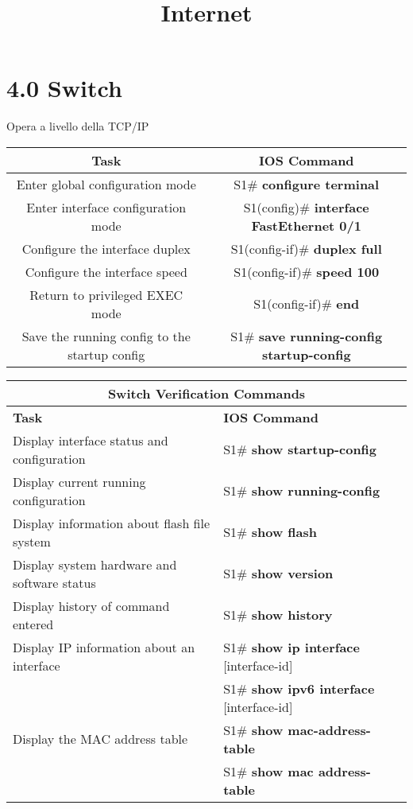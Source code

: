 \documentclass[12pt, a4paper]{article}
\title{Internet}
\date{}
\begin{document}
	\maketitle
	
	\section*{4.0 Switch}
	
	Opera a livello della TCP/IP \\
	\begin{center}
		\begin{tabular}{||c | c||} 
			\hline
			\textbf{Task} & \textbf{IOS Command}  \\ [1ex] 
			\hline\hline
			Enter global configuration mode & S1\# \textbf{configure terminal}  \\  [1ex]
			\hline
			Enter interface configuration mode & S1(config)\# \textbf{interface FastEthernet 0/1} \\ [1ex]
			\hline
			Configure the interface duplex & S1(config-if)\# \textbf{duplex full} \\ [1ex]
			\hline
			Configure the interface speed & S1(config-if)\# \textbf{speed 100} \\ [1ex]
			\hline
			Return to privileged EXEC mode & S1(config-if)\# \textbf{end} \\ [1ex]  
			\hline
			Save the running config to the startup config & S1\# \textbf{save running-config startup-config} \\ [1ex]
			\hline
		\end{tabular}
	\end{center}

	\begin{center}
		\begin{tabular}{ ||p{8cm}||p{8cm}|| }
			\hline
			\multicolumn{2}{|c|}{Switch Verification Commands} \\ [0.5ex]
			\hline\hline
			\textbf{Task} & \textbf{IOS Command} \\
			\hline\hline 
			Display interface status and configuration & S1\# \textbf{show startup-config} \\
			\hline
			Display current running configuration & S1\# \textbf{show running-config} \\
			\hline
			Display information about flash file system & S1\# \textbf{show flash} \\
			\hline
			Display system hardware and software status & S1\# \textbf{show version} \\
			\hline
			Display history of command entered & S1\# \textbf{show history} \\
			\hline
			Display IP information about an interface & S1\# \textbf{show ip interface} [interface-id]\\
			& S1\# \textbf{show ipv6 interface} [interface-id] \\
			\hline
			Display the MAC address table & S1\# \textbf{show mac-address-table} \\
			& S1\# \textbf{show mac address-table} \\
			\hline\hline
		\end{tabular}
	\end{center}
	
\end{document}
